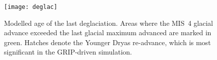 \documentclass[tc, ms]{copernicus}
\begin{document}
\begin{figure}
  \texttt{[image: deglac]}
  \caption{Modelled age of the last deglaciation. Areas where the MIS~4 glacial
           advance exceeded the last glacial maximum advanced are marked in
           green. Hatches denote the Younger Dryas re-advance, which is most
           significant in the GRIP-driven simulation.}
  \label{fig:deglac}
\end{figure}

\end{document}
